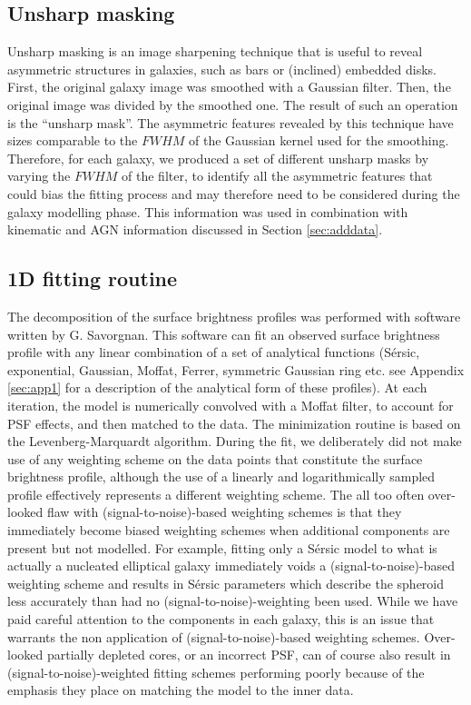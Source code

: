 \documentclass[preprint2]{emulateapj}
\begin{document}
\subsection{Unsharp masking}
Unsharp masking is an image sharpening technique that is useful to reveal asymmetric structures in galaxies, 
such as bars or (inclined) embedded disks. 
First, the original galaxy image was smoothed with a Gaussian filter.
Then, the original image was divided by the smoothed one. 
The result of such an operation is the ``unsharp mask''. 
The asymmetric features revealed by this technique have sizes 
comparable to the $FWHM$ of the Gaussian kernel used for the smoothing.
Therefore, for each galaxy, we produced a set of different unsharp masks by varying the $FWHM$ of the filter,
to identify all the asymmetric features that could bias the fitting process 
and may therefore need to be considered during the galaxy modelling phase.
This information was used in combination with kinematic and AGN information discussed in Section \ref{sec:adddata}.

\subsection{1D fitting routine}
The decomposition of the surface brightness profiles was performed with software written by G. Savorgnan.
This software can fit an observed surface brightness profile with any linear combination of 
a set of analytical functions (S\'ersic, exponential, Gaussian, Moffat, Ferrer, symmetric Gaussian ring etc. 
see Appendix \ref{sec:app1} for a description of the analytical form of these profiles).
At each iteration, 
the model is numerically convolved with a Moffat filter, to account for PSF effects, 
and then matched to the data.
The minimization routine is based on the Levenberg-Marquardt algorithm.
During the fit, we deliberately did not make use of any weighting scheme on the data points that constitute the 
surface brightness profile, 
although the use of a linearly and logarithmically sampled profile effectively represents a different weighting scheme.
The all too often over-looked flaw with (signal-to-noise)-based weighting schemes 
is that they immediately become biased weighting schemes when additional components are present but not modelled.
For example, fitting only a S\'ersic model to what is actually a nucleated elliptical galaxy immediately voids 
a (signal-to-noise)-based weighting scheme 
and results in S\'ersic parameters which describe the spheroid less accurately than had no (signal-to-noise)-weighting been used.
While we have paid careful attention to the components in each galaxy, 
this is an issue that warrants the non application of (signal-to-noise)-based weighting schemes.
Over-looked partially depleted cores, or an incorrect PSF, can of course also result in (signal-to-noise)-weighted fitting schemes 
performing poorly because of the emphasis they place on matching the model to the inner data. 
\end{document}
